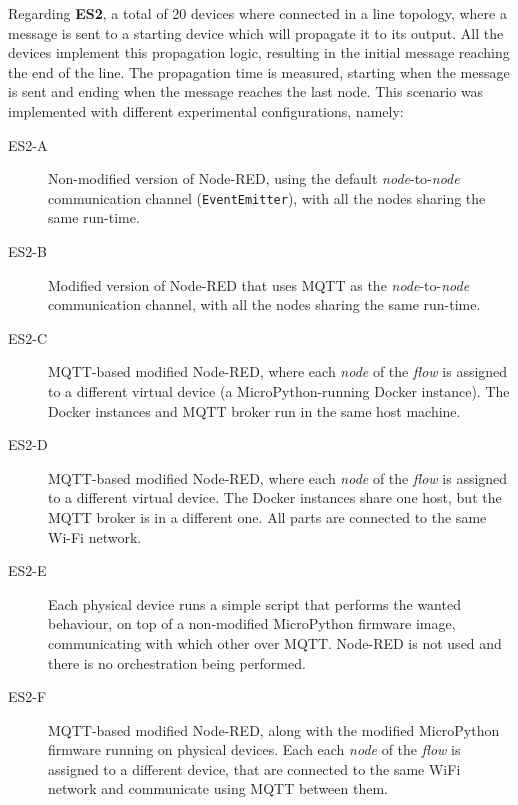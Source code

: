 Regarding \textbf{ES2}, a total of 20 devices where connected in a line topology, where a message is sent to a starting device which will propagate it to its output. All the devices implement this propagation logic, resulting in the initial message reaching the end of the line. The propagation time is measured, starting when the message is sent and ending when the message reaches the last node. This scenario was implemented with different experimental configurations, namely:
\begin{description}
    \item[ES2-A] Non-modified version of Node-RED, using the default \textit{node}-to-\textit{node} communication channel (\texttt{EventEmitter}), with all the nodes sharing the same run-time.
    
    \item[ES2-B] Modified version of Node-RED that uses MQTT as the \textit{node}-to-\textit{node} communication channel, with all the nodes sharing the same run-time.
    
    \item[ES2-C] MQTT-based modified Node-RED, where each \textit{node} of the \textit{flow} is assigned to a different virtual device (\ie a MicroPython-running Docker instance). The Docker instances and MQTT broker run in the same host machine.
    
    \item[ES2-D] MQTT-based modified Node-RED, where each \textit{node} of the \textit{flow} is assigned to a different virtual device. The Docker instances share one host, but the MQTT broker is in a different one. All parts are connected to the same Wi-Fi network.
    
    \item[ES2-E] Each physical device runs a simple script that performs the wanted behaviour, on top of a non-modified MicroPython firmware image, communicating with which other over MQTT. Node-RED is not used and there is no orchestration being performed.

    \item[ES2-F] MQTT-based modified Node-RED, along with the modified MicroPython firmware running on physical devices. Each each \textit{node} of the \textit{flow} is assigned to a different device, that are connected to the same WiFi network and communicate using MQTT between them. 
\end{description}


